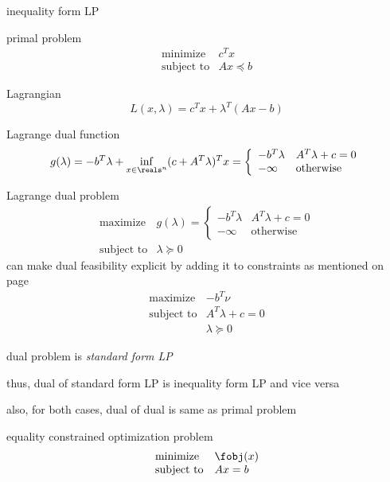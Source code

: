 \documentclass[17pt,landscape]{foils}
\begin{document}
{\item
	inequality form LP
	\bit
	\item
		primal problem
		$$
			\begin{array}{ll}
				\mbox{minimize} &
					c^Tx
				\\
				\mbox{subject to} &
					Ax \preceq b
			\end{array}
		$$
	\item
		Lagrangian
		$$
			L(x,\lambda) = c^Tx + \lambda^T(Ax-b)
		$$
	\item
		Lagrange dual function
		$$
			g(\lambda)
			=
				-b^T\lambda + \inf_{x\in\reals^n} (c+A^T\lambda)^T x
			=
				\left\{\begin{array}{ll}
				-b^T\lambda & A^T\lambda + c =0
				\\
				-\infty & \mbox{otherwise}
			\end{array}\right.
		$$

	\item
		Lagrange dual problem
		$$
			\begin{array}{ll}
				\mbox{maximize} &
					g(\lambda)
					= \left\{\begin{array}{ll}
						-b^T\lambda & A^T\lambda + c =0
						\\
						-\infty & \mbox{otherwise}
					\end{array}\right.
				\\
				\mbox{subject to} &
					\lambda \succeq 0
			\end{array}
		$$
		\bit
		\iitem
			can make dual feasibility explicit by adding it to constraints
			as mentioned on page~\pageref{page:make implicit dual feasibility explicit}\
			$$
				\begin{array}{ll}
					\mbox{maximize} &
						-b^T\nu
					\\
					\mbox{subject to} &
						A^T\lambda + c = 0
					\\ &
						\lambda \succeq 0
				\end{array}
			$$
		\eit
	\item
		dual problem is \emph{standard form LP}
	\eit

\vitem
	thus,
	dual of standard form LP is inequality form LP
	and vice versa

\vitem
	also, for both cases, dual of dual is same as primal problem
\eit



\bit
\item
	equality constrained optimization problem
	$$
		\begin{array}{ll}
			\mbox{minimize} &
				\fobj(x)
			\\
			\mbox{subject to} &
				Ax = b
		\end{array}
	$$

}
\end{document}
